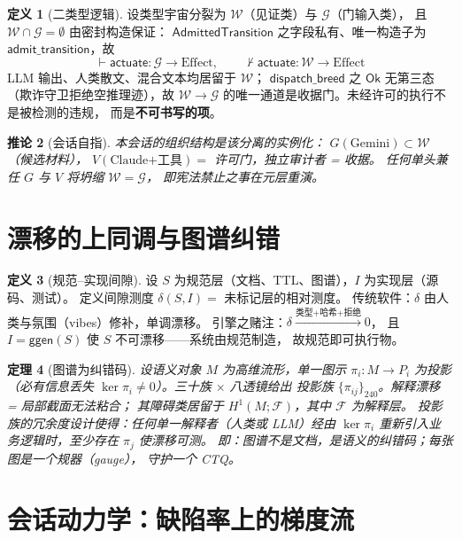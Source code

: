 \documentclass[11pt]{article}
\newtheorem{thm}{定理}[section]
\newtheorem{cor}[thm]{推论}
\theoremstyle{definition}
\newtheorem{defn}[thm]{定义}
\theoremstyle{remark}
\begin{document}
\begin{defn}[二类型逻辑]
设类型宇宙分裂为 $\mathcal{W}$（见证类）与 $\mathcal{G}$（门输入类），
且 $\mathcal{W} \cap \mathcal{G} = \emptyset$ 由密封构造保证：
$\mathsf{AdmittedTransition}$ 之字段私有、唯一构造子为
$\mathsf{admit\_transition}$，故
\[
\vdash \mathsf{actuate} : \mathcal{G} \to \mathrm{Effect}, \qquad
\nvdash \mathsf{actuate} : \mathcal{W} \to \mathrm{Effect}
\]
LLM 输出、人类散文、混合文本均居留于 $\mathcal{W}$；
$\mathsf{dispatch\_breed}$ 之 $\mathsf{Ok}$ 无第三态
（欺诈守卫拒绝空推理迹），故 $\mathcal{W} \to \mathcal{G}$
的唯一通道是收据门。未经许可的执行不是被检测的违规，
而是\textbf{不可书写的项}。
\end{defn}

\begin{cor}[会话自指]
本会话的组织结构是该分离的实例化：
$G(\text{Gemini}) \subset \mathcal{W}$（候选材料），
$V(\text{Claude+工具}) = $ 许可门，独立审计者 = 收据。
任何单头兼任 $G$ 与 $V$ 将坍缩 $\mathcal{W} = \mathcal{G}$，
即宪法禁止之事在元层重演。
\end{cor}

\section{漂移的上同调与图谱纠错}

\begin{defn}[规范--实现间隙]
设 $S$ 为规范层（文档、TTL、图谱），$I$ 为实现层（源码、测试）。
定义间隙测度 $\delta(S, I) = $ 未标记层的相对测度。
传统软件：$\delta$ 由人类与氛围（vibes）修补，单调漂移。
引擎之赌注：$\delta \xrightarrow{\text{类型+哈希+拒绝}} 0$，
且 $I = \mathsf{ggen}(S)$ 使 $S$ 不可漂移——系统由规范制造，
故规范即可执行物。
\end{defn}

\begin{thm}[图谱为纠错码]
设语义对象 $M$ 为高维流形，单一图示 $\pi_i : M \to P_i$ 为投影
（必有信息丢失 $\ker \pi_i \ne 0$）。三十族 $\times$ 八透镜给出
投影族 $\{\pi_{ij}\}_{240}$。解释漂移 = 局部截面无法粘合；
其障碍类居留于 $H^1(M; \mathcal{F})$，其中 $\mathcal{F}$ 为解释层。
投影族的冗余度设计使得：任何单一解释者（人类或 LLM）经由
$\ker \pi_i$ 重新引入业务逻辑时，至少存在 $\pi_j$ 使漂移可测。
即：图谱不是文档，是语义的纠错码；每张图是一个规器（gauge），
守护一个 CTQ。
\end{thm}

\section{会话动力学：缺陷率上的梯度流}
\end{document}
